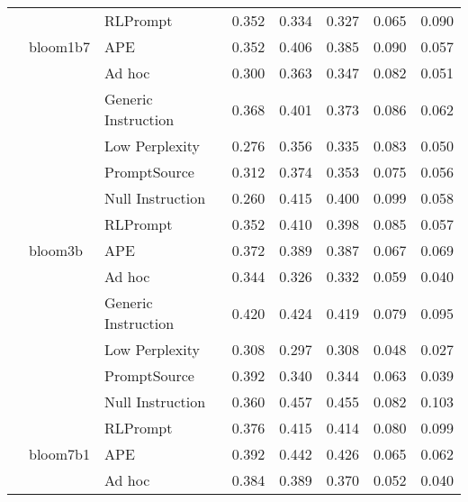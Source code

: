 \begin{supertabular}{lllrrrrr}
              &        & RLPrompt &            0.352 &           0.334 &          0.327 &        0.065 &    0.090 \\
              & bloom1b7 & APE &            0.352 &           0.406 &          0.385 &        0.090 &    0.057 \\
              &        & Ad hoc &            0.300 &           0.363 &          0.347 &        0.082 &    0.051 \\
              &        & Generic Instruction &            0.368 &           0.401 &          0.373 &        0.086 &    0.062 \\
              &        & Low Perplexity &            0.276 &           0.356 &          0.335 &        0.083 &    0.050 \\
              &        & PromptSource &            0.312 &           0.374 &          0.353 &        0.075 &    0.056 \\
              &        & Null Instruction &            0.260 &           0.415 &          0.400 &        0.099 &    0.058 \\
              &        & RLPrompt &            0.352 &           0.410 &          0.398 &        0.085 &    0.057 \\
              & bloom3b & APE &            0.372 &           0.389 &          0.387 &        0.067 &    0.069 \\
              &        & Ad hoc &            0.344 &           0.326 &          0.332 &        0.059 &    0.040 \\
              &        & Generic Instruction &            0.420 &           0.424 &          0.419 &        0.079 &    0.095 \\
              &        & Low Perplexity &            0.308 &           0.297 &          0.308 &        0.048 &    0.027 \\
              &        & PromptSource &            0.392 &           0.340 &          0.344 &        0.063 &    0.039 \\
              &        & Null Instruction &            0.360 &           0.457 &          0.455 &        0.082 &    0.103 \\
              &        & RLPrompt &            0.376 &           0.415 &          0.414 &        0.080 &    0.099 \\
              & bloom7b1 & APE &            0.392 &           0.442 &          0.426 &        0.065 &    0.062 \\
              &        & Ad hoc &            0.384 &           0.389 &          0.370 &        0.052 &    0.040 \\

\end{supertabular}
